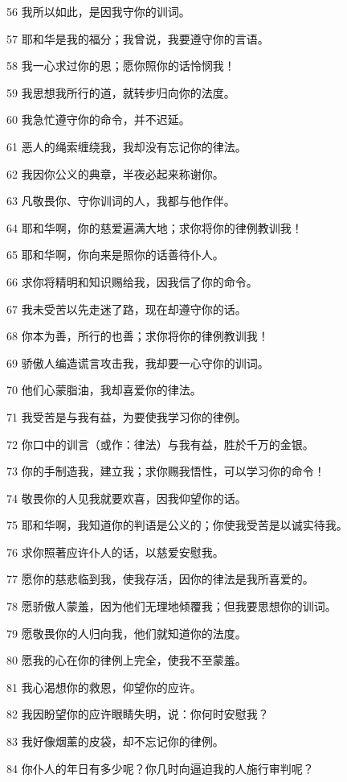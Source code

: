 \par 56 我所以如此，是因我守你的训词。
\par 57 耶和华是我的福分；我曾说，我要遵守你的言语。
\par 58 我一心求过你的恩；愿你照你的话怜悯我！
\par 59 我思想我所行的道，就转步归向你的法度。
\par 60 我急忙遵守你的命令，并不迟延。
\par 61 恶人的绳索缠绕我，我却没有忘记你的律法。
\par 62 我因你公义的典章，半夜必起来称谢你。
\par 63 凡敬畏你、守你训词的人，我都与他作伴。
\par 64 耶和华啊，你的慈爱遍满大地；求你将你的律例教训我！
\par 65 耶和华啊，你向来是照你的话善待仆人。
\par 66 求你将精明和知识赐给我，因我信了你的命令。
\par 67 我未受苦以先走迷了路，现在却遵守你的话。
\par 68 你本为善，所行的也善；求你将你的律例教训我！
\par 69 骄傲人编造谎言攻击我，我却要一心守你的训词。
\par 70 他们心蒙脂油，我却喜爱你的律法。
\par 71 我受苦是与我有益，为要使我学习你的律例。
\par 72 你口中的训言（或作：律法）与我有益，胜於千万的金银。
\par 73 你的手制造我，建立我；求你赐我悟性，可以学习你的命令！
\par 74 敬畏你的人见我就要欢喜，因我仰望你的话。
\par 75 耶和华啊，我知道你的判语是公义的；你使我受苦是以诚实待我。
\par 76 求你照著应许仆人的话，以慈爱安慰我。
\par 77 愿你的慈悲临到我，使我存活，因你的律法是我所喜爱的。
\par 78 愿骄傲人蒙羞，因为他们无理地倾覆我；但我要思想你的训词。
\par 79 愿敬畏你的人归向我，他们就知道你的法度。
\par 80 愿我的心在你的律例上完全，使我不至蒙羞。
\par 81 我心渴想你的救恩，仰望你的应许。
\par 82 我因盼望你的应许眼睛失明，说：你何时安慰我？
\par 83 我好像烟薰的皮袋，却不忘记你的律例。
\par 84 你仆人的年日有多少呢？你几时向逼迫我的人施行审判呢？
